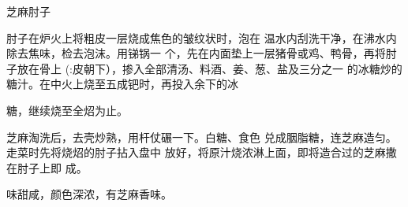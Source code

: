 \begin{recipe}{芝麻肘子}

\ingredients



\cooking

\step 肘子在炉火上将粗皮一层烧成焦色的皱纹状时，泡在 温水内刮洗干净，在沸水内除去焦味，检去泡沫。用锑锅一 个，先在内面垫上一层猪骨或鸡、鸭骨，再将肘子放在骨上 (:皮朝下），掺入全部清汤、料酒、姜、葱、盐及三分之一 的冰糖炒的糖汁。在中火上烧至五成钯时，再投入余下的冰

糖，继续烧至全炤为止。

\step 芝麻淘洗后，去壳炒熟，用杆仗碾一下。白糖、食色 兑成胭脂糖，连芝麻造匀。走菜时先将烧炤的肘子拈入盘中 放好，将原汁烧浓淋上面，即将造合过的芝麻撒在肘子上即 成。

\notes

味甜咸，颜色深浓，有芝麻香味。

\end{recipe}

